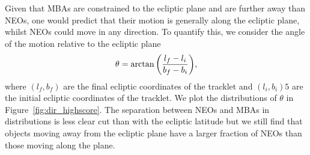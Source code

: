 \documentclass[twocolumn]{aastex631}
\begin{document}
Given that MBAs are constrained to the ecliptic plane and are further away than NEOs, one would predict that their motion is generally along the ecliptic plane, whilst NEOs could move in any direction. To quantify this, we consider the angle of the motion relative to the ecliptic plane
\begin{equation}
    \theta = \arctan \qty( \frac{l_f - l_i}{b_f - b_i} ),
\end{equation}
where $(l_f, b_f)$ are the final ecliptic coordinates of the tracklet and $(l_i, b_i)5$ are the initial ecliptic coordinates of the tracklet. We plot the distributions of $\theta$ in Figure~\ref{fig:dir_highscore}. The separation between NEOs and MBAs in distributions is less clear cut than with the ecliptic latitude but we still find that objects moving away from the ecliptic plane have a larger fraction of NEOs than those moving along the plane.
\end{document}
